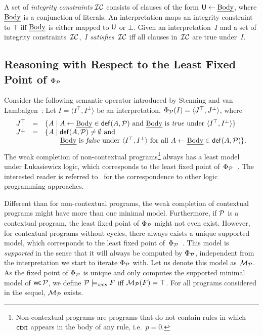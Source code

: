 \documentclass[12pt]{article}
\begin{document}
A set of \textit{integrity constraints} ${\cal IC}$ consists of clauses of
the form $\mathsf{U} \leftarrow \mbox{\em Body}$, where $\mbox{\em Body}$ is a conjunction of
literals. An interpretation maps
an integrity constraint to $\top$ iff $\mbox{\em Body}$ is either mapped to
$\mathsf{U}$ or $\bot$.  
Given an interpretation~$I$
and a set of integrity constraints~${\cal IC}$,~$I$ \textit{satisfies}~${\cal IC}$
iff all clauses in~${\cal IC}$ are true under~$I$.


\subsection{Reasoning with Respect to the Least Fixed Point of $\Phi_{{\cal P}}$}\label{sect:lfp}


Consider the following semantic operator introduced by Stenning and van Lambalgen~\cite{stenning:vanlambalgen:2008}: Let $I = \langle I^\top,I^\bot
\rangle$ be an interpretation. $\Phi_{\cal P} (I) =
\langle J^\top,J^\bot\rangle$, where
\[
\begin{array}{lcl}
J^\top & = & \{ A \mid A \leftarrow \Body \in \Def(A,\CalP)
\mbox{ and
} \Body \mbox{ is \True under } \langle I^\top,I^\bot \rangle \} \\
J^\bot & = & \{ A \mid \Def(A,\CalP) \neq \emptyset \mbox{ and }\\
&& \rule{7.5mm}{0mm}\Body \mbox{ is \False under } \langle
I^\top,I^\bot \rangle \mbox{ for all }  A \leftarrow \Body \in \Def(A,\CalP)\}.
\end{array}\Shrink
\]
The weak completion of non-contextual programs\footnote{Non-contextual programs are programs that do not contain rules in which $\mathsf{ctxt}$ appears in the body of any rule, i.e.\ $p = 0$.} 
always has a least model under  {\L}ukasiewicz logic,
which corresponds to the least fixed point of~$\Phi_{{\cal P}}$~\cite{hk:2009a}. 
The interested reader is referred to~\cite{dietz:hoelldobler:wernhard:2014} for the correspondence to other 
logic programming approaches.
 
Different than for non-contextual programs, the weak completion of contextual
programs might have more than one minimal model. Furthermore, if ${\cal P}$ is a contextual program, the least fixed point of $\Phi_{{\cal P}}$ might not even exist. However,
for contextual programs without cycles, there always exists a unique supported model,
which corresponds to the least fixed point of~$\Phi_{{\cal P}}$~\cite{dietz:hoelldobler:pereira:2017,dietz:hoelldobler:philipp:2017}. This model is \textit{supported} in the sense that 
it will always be computed by $\Phi_{{\cal P}}$, independent from the interpretation we start to iterate $\Phi_{{\cal P}}$ with. Let us denote this model as ${\cal M}_{\cal P}$.
As the fixed point of $\Phi_{{\cal P}}$ is unique and only computes the supported minimal model of $\mathsf{wc}\,{\cal P}$, 
we define 
${\cal P} \models_{wcs} F$ iff ${\cal M}_{\cal P}(F) = \top$.
For all programs considered in the sequel, ${\cal M}_{\cal P}$ exists.
\end{document}
